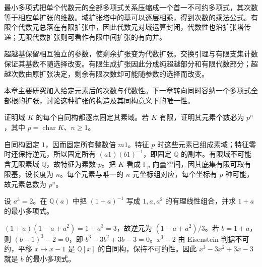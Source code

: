 




\begin{chaptersummary}
	最小多项式把单个代数元的全部多项式关系压缩成一个首一不可约多项式，其次数等于相应单扩张的维数。域扩张塔中的基可以逐层相乘，得到次数的乘法公式。有限个代数元总落在有限扩张中，因此代数元对域运算封闭，代数性也沿扩张塔传递；无限代数扩张则可看作有限中间扩张的有向并。

	\ProseParagraphBreak
	超越基保留相互独立的参数，使剩余扩张变为代数扩张。交换引理与有限支集计数保证其基数不随选择改变。有限生成扩张因此分成纯超越部分和有限代数部分；超越次数由原扩张决定，剩余有限次数却可能随参数的选择而改变。

	\ProseParagraphBreak
	本章主要研究加入给定元素后的次数与代数性。下一章转向同时容纳一个多项式全部根的扩张，讨论这种扩张的构造及其同构意义下的唯一性。
\end{chaptersummary}

\BookExercises

\begin{exercise}\label{b1:ex:14-1}
	证明域 \(K\) 的每个自同构都逐点固定其素域。若 \(K\) 有限，证明其元素个数必为 \(p^n\)，其中 \(p=\operatorname{char}K\)、\(n\geq1\)。
\end{exercise}
\begin{solution}
	自同构固定 \(1\)，因而固定所有整数倍 \(m1\)。特征 \(p\) 时这些元素已组成素域；特征零时还保持逆元，所以固定所有 \((a1)(b1)^{-1}\)，即固定 \(\mathbb Q\) 的副本。有限域不可能含无限素域 \(\mathbb Q\)，故特征为素数 \(p\)。把 \(K\) 看成 \(\mathbb F_p\) 向量空间，因其底集有限可取有限基，设长度为 \(n\)。每个元素与唯一的 \(n\) 元坐标组对应，每个坐标有 \(p\) 种可能，故元素总数为 \(p^n\)。
\end{solution}

\begin{exercise}\label{b1:ex:14-2}
	设 \(a^3=2\)。在 \(\mathbb Q(a)\) 中把 \((1+a)^{-1}\) 写成 \(1,a,a^2\) 的有理线性组合，并求 \(1+a\) 的最小多项式。
\end{exercise}
\begin{solution}
	\((1+a)(1-a+a^2)=1+a^3=3\)，故逆元为 \((1-a+a^2)/3\)。若 \(b=1+a\)，则 \((b-1)^3-2=0\)，即 \(b^3-3b^2+3b-3=0\)。\(x^3-2\) 由 Eisenstein 判据不可约，平移 \(x\mapsto x-1\) 是 \(\mathbb Q[x]\) 的自同构，保持不可约性。因此 \(x^3-3x^2+3x-3\) 就是 \(b\) 的最小多项式。
\end{solution}

